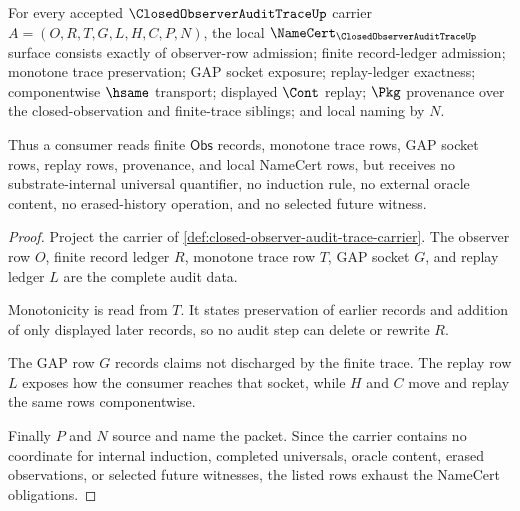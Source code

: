 \begin{theorem}
\label{thm:closed-observer-audit-trace-namecert-obligations}
For every accepted $\ClosedObserverAuditTraceUp$ carrier $A=(O,R,T,G,L,H,C,P,N)$, the local $\NameCert_{\ClosedObserverAuditTraceUp}$ surface consists exactly of observer-row admission; finite record-ledger admission; monotone trace preservation; GAP socket exposure; replay-ledger exactness; componentwise $\hsame$ transport; displayed $\Cont$ replay; $\Pkg$ provenance over the closed-observation and finite-trace siblings; and local naming by $N$.

Thus a consumer reads finite $\mathsf{Obs}$ records, monotone trace rows, GAP socket rows, replay rows, provenance, and local NameCert rows, but receives no substrate-internal universal quantifier, no induction rule, no external oracle content, no erased-history operation, and no selected future witness.
\end{theorem}
\begin{proof}
Project the carrier of \autoref{def:closed-observer-audit-trace-carrier}. The observer row $O$, finite record ledger $R$, monotone trace row $T$, GAP socket $G$, and replay ledger $L$ are the complete audit data.

Monotonicity is read from $T$. It states preservation of earlier records and addition of only displayed later records, so no audit step can delete or rewrite $R$.

The GAP row $G$ records claims not discharged by the finite trace. The replay row $L$ exposes how the consumer reaches that socket, while $H$ and $C$ move and replay the same rows componentwise.

Finally $P$ and $N$ source and name the packet. Since the carrier contains no coordinate for internal induction, completed universals, oracle content, erased observations, or selected future witnesses, the listed rows exhaust the NameCert obligations.
\end{proof}



